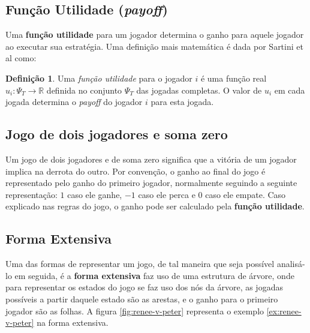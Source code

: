 \subsection{Função Utilidade (\emph{payoff})}
\label{subsec:funcao-utilidade}

Uma \textbf{função utilidade} para um jogador determina o ganho para aquele jogador ao executar sua estratégia. Uma definição mais matemática é dada por Sartini et al como:

\theoremstyle{definition}
\newtheorem{def:funcao-utilidade}{Definição}

\begin{def:funcao-utilidade}
Uma \emph{função utilidade} para o jogador $i$ é uma função real $u_i:\Psi_T \rightarrow \mathbb{R}$ definida no conjunto $\Psi_T$ das jogadas completas. O valor de $u_i$ em cada jogada determina o \emph{payoff} do jogador $i$ para esta jogada. \cite{sartini_IIbienaldasbm}
\end{def:funcao-utilidade}

\subsection{Jogo de dois jogadores e soma zero}
\label{subsec:jogo-de-dois-jogadores-e-soma-zero}

Um jogo de dois jogadores e de soma zero significa que a vitória de um jogador implica na derrota do outro. Por convenção, o ganho ao final do jogo é representado pelo ganho do primeiro jogador, normalmente seguindo a seguinte representação: $1$ caso ele ganhe, $-1$ caso ele perca e $0$ caso ele empate. Caso explicado nas regras do jogo, o ganho pode ser calculado pela \textbf{função utilidade}.

\subsection{Forma Extensiva}
\label{subsec:forma-extensiva}

Uma das formas de representar um jogo, de tal maneira que seja possível analisá-lo em seguida, é a \textbf{forma extensiva} faz uso de uma estrutura de árvore, onde para representar os estados do jogo se faz uso dos nós da árvore, as jogadas possíveis a partir daquele estado são as arestas, e o ganho para o primeiro jogador são as folhas. A figura \ref{fig:renee-v-peter} representa o exemplo \ref{ex:renee-v-peter} na forma extensiva.

